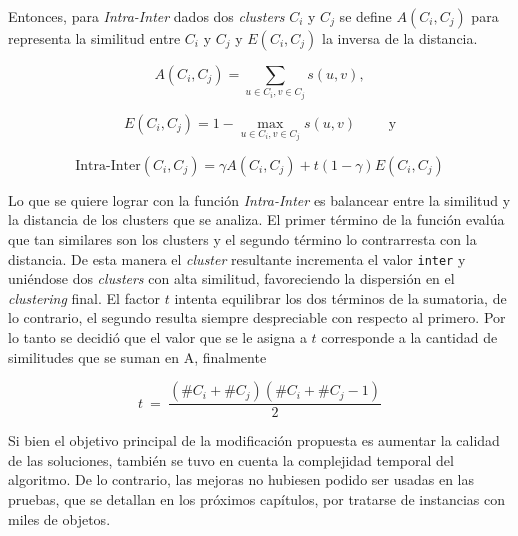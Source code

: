 Entonces, para \textit{Intra-Inter} dados dos {\em clusters} $C_i$ y $C_j$ se define $A(C_i,C_j)$ para representa la similitud entre $C_i$ y $C_j$ y $E(C_i,C_j)$ la inversa de la distancia.

$$A(C_i,C_j) = \sum_{u \in C_i, v \in C_j}{s(u,v)},$$

$$E(C_i,C_j)= 1 - \max_{u \in C_i, v \in C_j}{s(u,v)} \qquad \mbox{ y}$$

$$\mbox{Intra-Inter}(C_i,C_j) = \gamma A(C_i,C_j) + t (1-\gamma) E(C_i,C_j)$$

Lo que se quiere lograr con la función \textit{Intra-Inter} es balancear entre la similitud y la distancia de los clusters que se analiza. El primer término de la función evalúa que tan similares son los clusters y el segundo término lo contrarresta con la distancia. De esta manera el {\em cluster} resultante incrementa el valor \texttt{inter} y uniéndose dos {\em clusters} con alta similitud, favoreciendo la dispersión en el {\em clustering} final. El factor $t$ intenta equilibrar los dos términos de la sumatoria, de lo contrario, el segundo resulta siempre despreciable con respecto al primero. Por lo tanto se decidió que el valor que se le asigna a $t$ corresponde a la cantidad de similitudes que se suman en A, finalmente

$$t\ =\ \frac{(\#C_i + \#C_j) (\#C_i + \#C_j - 1)}{2}$$

Si bien el objetivo principal de la modificación propuesta es aumentar la calidad de las soluciones, también se tuvo en cuenta la complejidad temporal del algoritmo. De lo contrario, las mejoras no hubiesen podido ser usadas en las pruebas, que se detallan en los próximos capítulos, por tratarse de instancias con miles de objetos.

